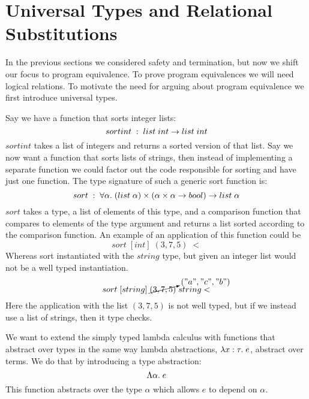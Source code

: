 \section*{Universal Types and Relational Substitutions}
In the previous sections we considered safety and termination, but now we shift our focus to program equivalence. To prove program equivalences we will need logical relations. To motivate the need for arguing about program equivalence we first introduce universal types.

Say we have a function that sorts integer lists:
\[
  sortint \; : \;  list \; int \rightarrow list \; int
\]
$sortint$ takes a list of integers and returns a sorted version of that list. Say we now want a function that sorts lists of strings, then instead of implementing a separate function we could factor out the code responsible for sorting and have just one function. The type signature of such a generic sort function is:
\[
  sort \; : \; \forall \alpha.\;  (list \; \alpha) \times ( \alpha \times \alpha \rightarrow bool ) \rightarrow list \; \alpha
\]
$sort$ takes a type, a list of elements of this type, and a comparison function that compares to elements of the type argument and returns a list sorted according to the comparison function. An example of an application of this function could be
\[
  sort \; [int] \; (3,7,5) \; <
\]
Whereas sort instantiated with the $string$ type, but given an integer list would not be a well typed instantiation.
\[
  sort \; [string] \; \cancelto{("a","c","b")}{(3,7,5)} \; string<
\]
Here the application with the list $(3,7,5)$ is not well typed, but if we instead use a list of strings, then it type checks. 

We want to extend the simply typed lambda calculus with functions that abstract over types in the same way lambda abstractions, $\lambda x : \tau . \; e$, abstract over terms. We do that by introducing a type abstraction:
\[
  \Lambda \alpha . \; e
\]
This function abstracts over the type $\alpha$ which allows $e$ to depend on $\alpha$.


